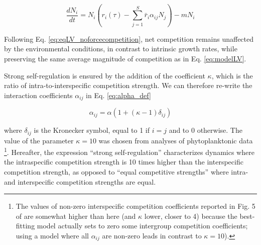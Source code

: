 \documentclass[a4paper,12pt]{article}
\begin{document}
\begin{equation}
\frac{dN_{i}}{dt}=N_{i}\left(r_{i}(\tau)-\sum_{j=1}^{S}\bar{r}_{i}\alpha_{ij}N_{j}\right)-mN_{i}\label{eq:eqLV_noforcecompetition}
\end{equation}

Following Eq. \ref{eq:eqLV_noforcecompetition}, net competition remains
unaffected by the environmental conditions, in contrast to intrinsic
growth rates, while preserving the same average magnitude of competition
as in Eq. \ref{eq:modelLV}.

Strong self-regulation is ensured by the addition of the coefficient
$\kappa$, which is the ratio of intra-to-interspecific competition
strength. We can therefore re-write the interaction coefficients $\alpha_{ij}$
in Eq. \ref{eq:alpha_def}

\begin{equation}
\alpha_{ij}=\alpha\left(1+(\kappa-1)\delta_{ij}\right)\label{eq:alpha_def}
\end{equation}

where $\delta_{ij}$ is the Kronecker symbol, equal to 1 if $i=j$
and to 0 otherwise. The value of the parameter $\kappa=10$ was chosen
from analyses of phytoplanktonic data \citep{barraquand2018coastal}\footnote{The values of non-zero interspecific competition coefficients reported in Fig. 5 of \citet{barraquand2018coastal} are somewhat higher than here (and $\kappa$ lower, closer to 4) because the best-fitting model actually sets to zero some intergroup competition coefficients; using a model where all $\alpha_{ij}$ are non-zero leads in contrast to $\kappa=10$). }. Hereafter, the expression ``strong self-regulation'' characterizes
dynamics where the intraspecific competition strength is 10 times
higher than the interspecific competition strength, as opposed to
``equal competitive strengths'' where intra- and interspecific competition
strengths are equal.
\end{document}
